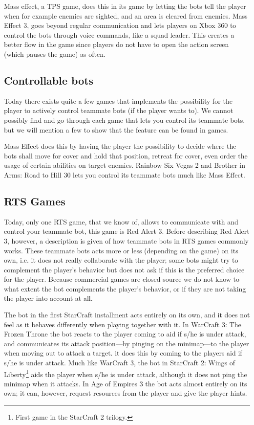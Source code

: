 Mass effect, a TPS game, does this in its game by letting the bots tell the player when for example enemies are sighted, and an area is cleared from enemies. Mass Effect 3, goes beyond regular communication and lets players on Xbox 360 to control the bots through voice commands, like a squad leader. This creates a better flow in the game since players do not have to open the action screen (which pauses the game) as often.


\subsection{Controllable bots}
\label{sec:games_controllable}
Today there exists quite a few games that implements the possibility for the player to actively control teammate bots (if the player wants to). We cannot possibly find and go through each game that lets you control its teammate bots, but we will mention a few to show that the feature can be found in games.

Mass Effect\cite{masseffect} does this by having the player the possibility to decide where the bots shall move for cover and hold that position, retreat for cover, even order the usage of certain abilities on target enemies. Rainbow Six Vegas 2\cite{rainbow6} and Brother in Arms: Road to Hill 30\cite{brotherinarms} lets you control its teammate bots much like Mass Effect.


\subsection{RTS Games}
Today, only one RTS game, that we know of, allows to communicate with and control your teammate bot, this game is Red Alert 3\cite{redalert3}. Before describing Red Alert 3, however, a description is given of how teammate bots in RTS games commonly works. These teammate bots acts more or less (depending on the game) on its own, i.e. it does not really collaborate with the player; some bots might try to complement the player's behavior but does not ask if this is the preferred choice for the player. Because commercial games are closed source we do not know to what extent the bot complements the player's behavior, or if they are not taking the player into account at all.

The bot in the first StarCraft\cite{scbw} installment acts entirely on its own, and it does not feel as it behaves differently when playing together with it. In WarCraft 3: The Frozen Throne\cite{wc3ft} the bot reacts to the player coming to aid if s/he is under attack, and communicates its attack position—by pinging on the minimap—to the player when moving out to attack a target. it does this by coming to the players aid if s/he is under attack. Much like WarCraft 3, the bot in StarCraft 2: Wings of Liberty\footnote{First game in the StarCraft 2 trilogy.}\cite{sc2wol} aids the player when s/he is under attack, although it does not ping the minimap when it attacks. In Age of Empires 3\cite{ageofempires3} the bot acts almost entirely on its own; it can, however, request resources from the player and give the player hints.


